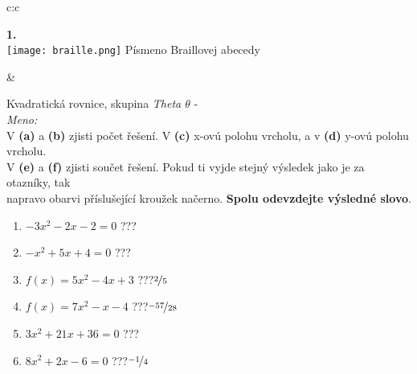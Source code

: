 \documentclass[10pt]{report}
\begin{document}
\begin{tabular}{c:c}
\begin{minipage}[c][99mm][t]{0.49\linewidth}
\begin{center}
\begin{minipage}{0.20\linewidth}
\begin{center}
{\Huge\bfseries 1.} \\[2mm]
\texttt{[image: braille.png]}
{\small Písmeno Braillovej abecedy}
\end{center}
\end{minipage}
\end{center}
\end{minipage}
&
\begin{minipage}[c][99mm][t]{0.49\linewidth}
\begin{center}
\vspace{7mm}
{\huge Kvadratická rovnice, skupina \textit{Theta $\theta$} -}\\[4.5mm]
\textit{Meno:}\phantom{xxxxxxxxxxxxxxxxxxxxxxxxxxxxxxxxxxxxxxxxxxxxxxxxxxxxxxxxxxxxxxxxx}\\[3.5mm]
V \textbf{(a)} a \textbf{(b)} zjisti počet řešení. V \textbf{(c)} x-ovú polohu vrcholu, a v \textbf{(d)} y-ovú polohu vrcholu.\\V \textbf{(e)} a \textbf{(f)} zjisti součet řešení. Pokud ti vyjde stejný výsledek jako je za otazníky, tak\\napravo obarvi příslušející kroužek načerno. \textbf{Spolu odevzdejte výsledné slovo}.\\[3mm]
\begin{minipage}{0.77\linewidth}
\begin{center}
\begin{varwidth}{\textwidth}
\begin{enumerate}
\large
\item $-3x^2-2x-2=0$\quad \dotfill\; ???\;\dotfill {}
\item $-x^2+5x+4=0$\quad \dotfill\; ???\;\dotfill {}
\item $f(x)=5x^2-4x+3$\quad \dotfill\; ???\;\dotfill \quad $\nicefrac{2}{5}$
\item $f(x)=7x^2-x-4$\quad \dotfill\; ???\;\dotfill \quad $\nicefrac{-57}{28}$
\item $3x^2+21x+36=0$\quad \dotfill\; ???\;\dotfill {}
\item $8x^2+2x-6=0$\quad \dotfill\; ???\;\dotfill \quad $\nicefrac{-1}{4}$
\end{enumerate}
\end{varwidth}
\end{center}
\end{minipage}
\begin{minipage}{0.20\linewidth}

\end{minipage}
\end{center}
\end{minipage}
\end{tabular}
\end{document}
